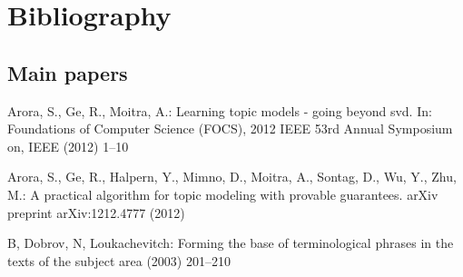 \documentclass{beamer}
\begin{document}
\section*{Bibliography}
\subsection*{Main papers}
\begin{frame}
	\begin{thebibliography}{10}
		\beamertemplatebookbibitems
		
		\item Arora, S., Ge, R., Moitra, A.: Learning topic models - going beyond svd. In:
		Foundations of Computer Science (FOCS), 2012 IEEE 53rd Annual Symposium
		on, IEEE (2012) 1–10
		\item Arora, S., Ge, R., Halpern, Y., Mimno, D., Moitra, A., Sontag, D., Wu, Y., Zhu,
		M.: A practical algorithm for topic modeling with provable guarantees. arXiv
		preprint arXiv:1212.4777 (2012)
		\item B, Dobrov, N, Loukachevitch: Forming the base of terminological phrases in the texts of the
		subject area (2003) 201–210
	\end{thebibliography}
\end{frame}
\end{document}
